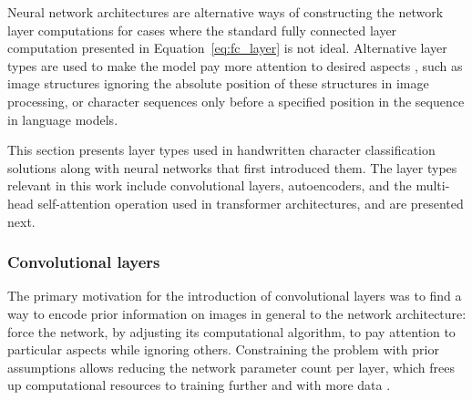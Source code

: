 \documentclass{article}
\begin{document}
Neural network architectures are alternative ways of constructing the 
network layer computations for cases where the standard 
fully connected layer computation presented in Equation~\ref{eq:fc_layer}
is not ideal. Alternative layer types are used to make the model pay more attention to desired 
aspects \cite{alexnet}, such as image structures ignoring the absolute position of these structures in image processing, or 
character sequences only before a specified position in the sequence in language models.

This section presents layer types used in handwritten character classification 
solutions along with neural networks that first introduced them.
The layer types relevant in this work include convolutional layers, autoencoders, and the multi-head self-attention operation used in transformer 
architectures, and are presented next.

\subsubsection{Convolutional layers}

The primary motivation for the introduction of convolutional layers was to find a way to encode prior information 
on images in general to the network architecture: force the network, by adjusting its computational 
algorithm, to pay attention to particular aspects while ignoring others. Constraining the problem with 
 prior assumptions allows reducing the network parameter count per layer, which frees up 
computational resources to training further and with more data \cite{alexnet}.

\end{document}
